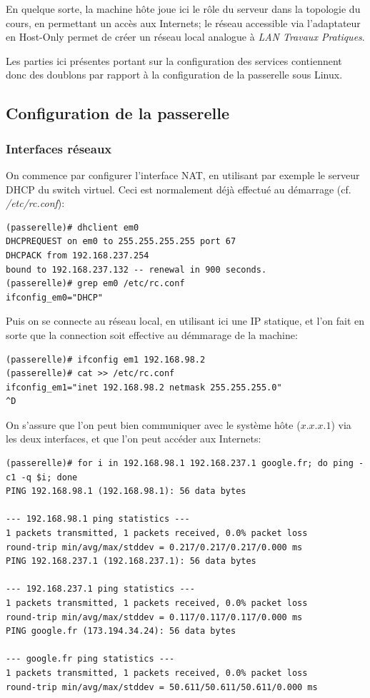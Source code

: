 \documentclass[a4paper]{article}
\begin{document}
En quelque sorte, la machine hôte joue ici le rôle du serveur
dans la topologie du cours, en permettant un accès aux Internets;
le réseau accessible via l'adaptateur en Host-Only permet de
créer un réseau local analogue à \textit{LAN Travaux Pratiques}.

Les parties ici présentes portant sur la configuration des services
contiennent donc des doublons par rapport à la configuration
de la passerelle sous Linux.

\subsection{Configuration de la passerelle}
\subsubsection{Interfaces réseaux}
On commence par configurer l'interface NAT, en utilisant par
exemple le serveur DHCP du switch virtuel. Ceci est normalement
déjà effectué au démarrage (cf. \textit{/etc/rc.conf}):
\begin{verbatim}
(passerelle)# dhclient em0
DHCPREQUEST on em0 to 255.255.255.255 port 67
DHCPACK from 192.168.237.254
bound to 192.168.237.132 -- renewal in 900 seconds.
(passerelle)# grep em0 /etc/rc.conf 
ifconfig_em0="DHCP"
\end{verbatim}

Puis on se connecte au réseau local, en utilisant ici une IP
statique, et l'on fait en sorte que la connection soit effective
au démmarage de la machine:
\begin{verbatim}
(passerelle)# ifconfig em1 192.168.98.2
(passerelle)# cat >> /etc/rc.conf
ifconfig_em1="inet 192.168.98.2 netmask 255.255.255.0"
^D
\end{verbatim}

On s'assure que l'on peut bien communiquer avec le système hôte
($x.x.x.1$) via les deux interfaces, et que l'on peut accéder aux
Internets:
\begin{verbatim}
(passerelle)# for i in 192.168.98.1 192.168.237.1 google.fr; do ping -c1 -q $i; done
PING 192.168.98.1 (192.168.98.1): 56 data bytes

--- 192.168.98.1 ping statistics ---
1 packets transmitted, 1 packets received, 0.0% packet loss
round-trip min/avg/max/stddev = 0.217/0.217/0.217/0.000 ms
PING 192.168.237.1 (192.168.237.1): 56 data bytes

--- 192.168.237.1 ping statistics ---
1 packets transmitted, 1 packets received, 0.0% packet loss
round-trip min/avg/max/stddev = 0.117/0.117/0.117/0.000 ms
PING google.fr (173.194.34.24): 56 data bytes

--- google.fr ping statistics ---
1 packets transmitted, 1 packets received, 0.0% packet loss
round-trip min/avg/max/stddev = 50.611/50.611/50.611/0.000 ms
\end{verbatim}
\end{document}
